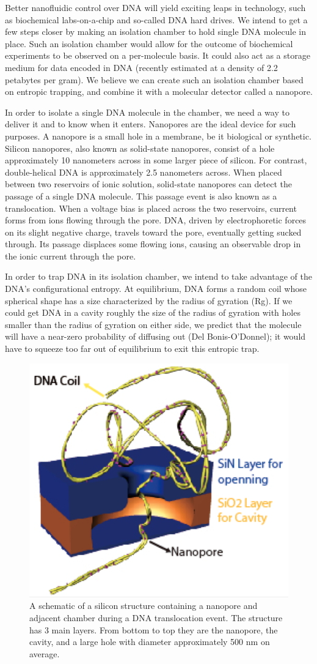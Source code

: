 \documentclass[aps,prl,preprint,groupedaddress]{revtex4}
\begin{document}
Better nanofluidic control over DNA will yield exciting leaps in technology, such as biochemical labs-on-a-chip and so-called DNA hard drives. We intend to get a few steps closer by making an isolation chamber to hold single DNA molecule in place. Such an isolation chamber would allow for the outcome of biochemical experiments to be observed on a per-molecule basis. It could also act as a storage medium for data encoded in DNA (recently estimated at a density of 2.2 petabytes per gram). We believe we can create such an isolation chamber based on entropic trapping, and combine it with a molecular detector called a nanopore.

In order to isolate a single DNA molecule in the chamber, we need a way to deliver it and to know when it enters. Nanopores are the ideal device for such purposes. A nanopore is a small hole in a membrane, be it biological or synthetic. Silicon nanopores, also known as solid-state nanopores, consist of a hole approximately 10 nanometers across in some larger piece of silicon. For contrast, double-helical DNA is approximately 2.5 nanometers across. When placed between two reservoirs of ionic solution, solid-state nanopores can detect the passage of a single DNA molecule. This passage event is also known as a translocation. When a voltage bias is placed across the two reservoirs, current forms from ions flowing through the pore. DNA, driven by electrophoretic forces on its slight negative charge, travels toward the pore, eventually getting sucked through. Its passage displaces some flowing ions, causing an observable drop in the ionic current through the pore.

In order to trap DNA in its isolation chamber, we intend to take advantage of the DNA’s configurational entropy. At equilibrium, DNA forms a random coil whose spherical shape has a size characterized by the radius of gyration (Rg). If we could get DNA in a cavity roughly the size of the radius of gyration with holes smaller than the radius of gyration on either side, we predict that the molecule will have a near-zero probability of diffusing out (Del Bonis-O’Donnel); it would have to squeeze too far out of equilibrium to exit this entropic trap.

\begin{figure}
\centering
\includegraphics[width=.4\textwidth]{figures/nanopore-schematic}
\caption{A schematic of a silicon structure containing a nanopore and adjacent chamber during a DNA translocation event. The structure has 3 main layers. From bottom to top they are the nanopore, the cavity, and a large hole with diameter approximately 500 nm on average.}
\label{fig:nanopore-schematic}
\end{figure}
\end{document}
